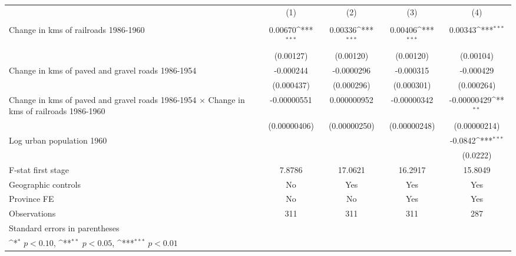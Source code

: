 {
\def\sym#1{\ifmmode^{#1}\else\(^{#1}\)\fi}
\begin{tabular}{l*{4}{c}}
\hline\hline
                &\multicolumn{1}{c}{(1)}&\multicolumn{1}{c}{(2)}&\multicolumn{1}{c}{(3)}&\multicolumn{1}{c}{(4)}\\
                &\multicolumn{1}{c}{}&\multicolumn{1}{c}{}&\multicolumn{1}{c}{}&\multicolumn{1}{c}{}\\
\hline
Change in kms of railroads 1986-1960&  0.00670\sym{***}&  0.00336\sym{***}&  0.00406\sym{***}&  0.00343\sym{***}\\
                &(0.00127)         &(0.00120)         &(0.00120)         &(0.00104)         \\
[1em]
Change in kms of paved and gravel roads 1986-1954&-0.000244         &-0.0000296         &-0.000315         &-0.000429         \\
                &(0.000437)         &(0.000296)         &(0.000301)         &(0.000264)         \\
[1em]
Change in kms of paved and gravel roads 1986-1954 $\times$ Change in kms of railroads 1986-1960&-0.00000551         &0.000000952         &-0.00000342         &-0.00000429\sym{**} \\
                &(0.00000406)         &(0.00000250)         &(0.00000248)         &(0.00000214)         \\
[1em]
Log urban population 1960&                  &                  &                  &  -0.0842\sym{***}\\
                &                  &                  &                  & (0.0222)         \\
\hline
F-stat first stage&   7.8786         &  17.0621         &  16.2917         &  15.8049         \\
Geographic controls&       No         &      Yes         &      Yes         &      Yes         \\
Province FE     &       No         &       No         &      Yes         &      Yes         \\
Observations    &      311         &      311         &      311         &      287         \\
\hline\hline
\multicolumn{5}{l}{\footnotesize Standard errors in parentheses}\\
\multicolumn{5}{l}{\footnotesize \sym{*} \(p<0.10\), \sym{**} \(p<0.05\), \sym{***} \(p<0.01\)}\\
\end{tabular}
}
